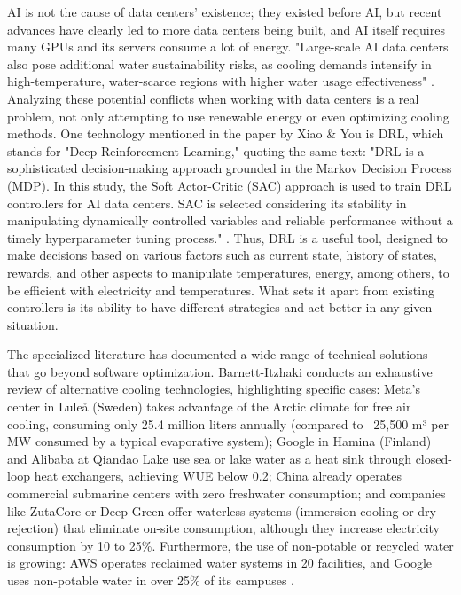 \documentclass[conference]{IEEEtran}
\begin{document}
AI is not the cause of data centers' existence; they existed before AI, but recent advances have clearly led to more data centers being built, and AI itself requires many GPUs and its servers consume a lot of energy. "Large-scale AI data centers also pose additional water sustainability risks, as cooling demands intensify in high-temperature, water-scarce regions with higher water usage effectiveness" \cite{Xiao2025}. Analyzing these potential conflicts when working with data centers is a real problem, not only attempting to use renewable energy or even optimizing cooling methods. One technology mentioned in the paper by Xiao \& You \cite{Xiao2025} is DRL, which stands for "Deep Reinforcement Learning," quoting the same text: "DRL is a sophisticated decision-making approach grounded in the Markov Decision Process (MDP). In this study, the Soft Actor-Critic (SAC) approach is used to train DRL controllers for AI data centers. SAC is selected considering its stability in manipulating dynamically controlled variables and reliable performance without a timely hyperparameter tuning process." \cite{Xiao2025}. Thus, DRL is a useful tool, designed to make decisions based on various factors such as current state, history of states, rewards, and other aspects to manipulate temperatures, energy, among others, to be efficient with electricity and temperatures. What sets it apart from existing controllers is its ability to have different strategies and act better in any given situation.

The specialized literature has documented a wide range of technical solutions that go beyond software optimization. Barnett-Itzhaki \cite{Barnett2026} conducts an exhaustive review of alternative cooling technologies, highlighting specific cases: Meta's center in Luleå (Sweden) takes advantage of the Arctic climate for free air cooling, consuming only 25.4 million liters annually (compared to ~25,500 m³ per MW consumed by a typical evaporative system); Google in Hamina (Finland) and Alibaba at Qiandao Lake use sea or lake water as a heat sink through closed-loop heat exchangers, achieving WUE below 0.2; China already operates commercial submarine centers with zero freshwater consumption; and companies like ZutaCore or Deep Green offer waterless systems (immersion cooling or dry rejection) that eliminate on-site consumption, although they increase electricity consumption by 10 to 25\%. Furthermore, the use of non-potable or recycled water is growing: AWS operates reclaimed water systems in 20 facilities, and Google uses non-potable water in over 25\% of its campuses \cite{Barnett2026}.
\end{document}
